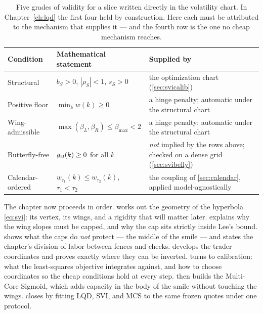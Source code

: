 \begin{table}[htbp]
\centering\small
\setlength{\tabcolsep}{5pt}
\renewcommand{\arraystretch}{1.15}
\begin{tabular}{@{}p{}p{}p{}@{}}
\toprule
Condition & Mathematical statement & Supplied by\\
\midrule
Structural & $b_S>0$, $|\rho_S|<1$, $s_S>0$ & the optimization chart
(\cref{sec:svicalib})\\
Positive floor & $\min_k w(k)\ge0$ & a hinge penalty; automatic under the
structural chart\\
Wing-admissible & $\max(\beta_L,\beta_R)\le\beta_{\max}<2$ & a hinge
penalty; automatic under the structural chart\\
Butterfly-free & $g_{\rm D}(k)\ge0$ for all $k$ & \emph{not} implied by
the rows above; checked on a dense grid (\cref{sec:svibelly})\\
Calendar-ordered & $w_{\tau_1}(k)\le w_{\tau_2}(k)$, $\tau_1<\tau_2$ &
the coupling of \cref{sec:calendar}, applied model-agnostically\\
\bottomrule
\end{tabular}
\caption{Five grades of validity for a slice written directly in the
volatility chart.  In Chapter~\ref{ch:lqd} the first four held by
construction.  Here each must be attributed to the mechanism that
supplies it --- and the fourth row is the one no cheap mechanism
reaches.}
\label{tab:tiers}
\end{table}

The chapter now proceeds in order.   works out the
geometry of the hyperbola \eqref{eq:svi}: its vertex, its wings, and a
rigidity that will matter later.   explains why the
wing slopes must be capped, and why the cap sits strictly inside Lee's
bound.   shows what the caps do \emph{not} protect
--- the middle of the smile --- and states the chapter's division of
labor between fences and checks.   develops the trader
coordinates and proves exactly where they can be inverted.
 turns to calibration: what the least-squares
objective integrates against, and how to choose coordinates so the
cheap conditions hold at every step.   then builds the
Multi-Core Sigmoid, which adds capacity in the body of the smile without
touching the wings.   closes by fitting LQD, SVI,
and MCS to the same frozen quotes under one protocol.

